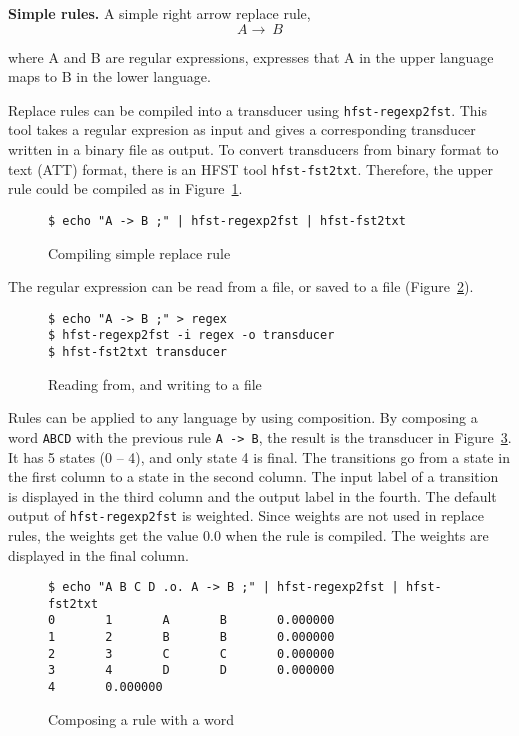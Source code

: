\documentclass{llncs}
\begin{document}

\textbf{Simple rules.} A simple right arrow replace rule,
\begin{equation}
  A \rightarrow\ B
\end{equation}

where A and B are regular expressions, 
expresses that A in the upper language maps to B in the lower language.

Replace rules can be compiled into a transducer using
\verb!hfst-regexp2fst!. This tool takes a regular expresion as input 
and gives a corresponding transducer written in a binary file as output. 
To convert transducers from binary format to text (ATT) format, 
there is an HFST tool \verb!hfst-fst2txt!. Therefore, the upper rule 
could be compiled as in Figure~\ref{fig:simple_replace}.

\begin{figure} [h!]
{\footnotesize
\begin{verbatim}
$ echo "A -> B ;" | hfst-regexp2fst | hfst-fst2txt
\end{verbatim}
}
\caption{Compiling simple replace rule}
\label{fig:simple_replace}
\end{figure}


The regular expression can be read from a file, or saved to a file (Figure~\ref{fig:read_from_file}). 

\begin{figure} [h!]
{\footnotesize
\begin{verbatim}
$ echo "A -> B ;" > regex
$ hfst-regexp2fst -i regex -o transducer
$ hfst-fst2txt transducer
\end{verbatim}
}
\caption{Reading from, and writing to a file}
\label{fig:read_from_file}
\end{figure}


Rules can be applied to any language by using composition.  By
composing a word \verb!ABCD! with the previous rule \verb!A -> B!, the
result is the transducer in Figure~\ref{fig:replace_compose}.  It has
5 states (0 -- 4), and only state 4 is final. The transitions go from a state in the first column to a state in the second column. The input label of a transition is displayed in the third column and the output label in the fourth. The default output of \verb!hfst-regexp2fst! is weighted. Since weights are
not used in replace rules, the weights get the value 0.0 when the rule is
compiled. The weights are displayed in the final column.

\begin{figure} [h!]
{\footnotesize
\begin{verbatim}
$ echo "A B C D .o. A -> B ;" | hfst-regexp2fst | hfst-fst2txt
0       1       A       B       0.000000
1       2       B       B       0.000000
2       3       C       C       0.000000
3       4       D       D       0.000000
4       0.000000
\end{verbatim}
}
\caption{Composing a rule with a word}
\label{fig:replace_compose}
\end{figure}
\end{document}
